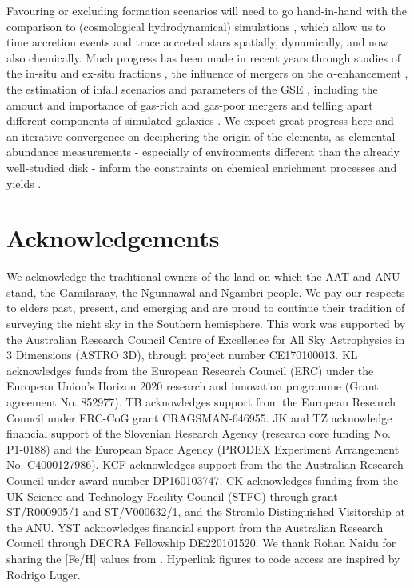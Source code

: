 \documentclass[fleqn,usenatbib]{mnras}
\begin{document}
Favouring or excluding formation scenarios will need to go hand-in-hand with the comparison to (cosmological hydrodynamical) simulations \citep[e.g.][]{Mackereth2018, Bonaca2017, Wu2021}, which allow us to time accretion events and trace accreted stars spatially, dynamically, and now also chemically. Much progress has been made in recent years through studies of the in-situ and ex-situ fractions \citep[e.g.][]{Pillepich2015}, the influence of mergers on the $\alpha$-enhancement \citep[e.g.][]{Zolotov2010, Grand2020, Buck2020, Renaud2021}, the estimation of infall scenarios and parameters of the GSE \citep[e.g.][]{Villalobos2008, Koppelman2021, Naidu2021}, including the amount and importance of gas-rich and gas-poor mergers \citep[e.g.][]{Fensch2017, Renaud2021b} and telling apart different components of simulated galaxies \citep[e.g.][]{Obreja2019}. We expect great progress here and an iterative convergence on deciphering the origin of the elements, as elemental abundance measurements - especially of environments different than the already well-studied disk - inform the constraints on chemical enrichment processes and yields \citep[e.g.][]{FernandezAlvar2018b, Vincenzo2019, Eitner2020, Sanders2021, Ishigaki2021}.

\section*{Acknowledgements}

We acknowledge the traditional owners of the land on which the AAT and ANU stand, the Gamilaraay, the Ngunnawal and Ngambri people. We pay our respects to elders past, present, and emerging and are proud to continue their tradition of surveying the night sky in the Southern hemisphere.
This work was supported by the Australian Research Council Centre of Excellence for All Sky Astrophysics in 3 Dimensions (ASTRO 3D), through project number CE170100013.
KL acknowledges funds from the European Research Council (ERC) under the European Union's Horizon 2020 research and innovation programme (Grant agreement No. 852977).
TB acknowledges support from the European Research Council under ERC-CoG grant CRAGSMAN-646955.
JK and TZ acknowledge financial support of the Slovenian Research Agency (research core funding No. P1-0188) and the European Space Agency (PRODEX Experiment Arrangement No. C4000127986).
KCF acknowledges support from the the Australian Research Council under award number DP160103747.
CK acknowledges funding from the UK Science and Technology Facility Council (STFC) through grant ST/R000905/1 and ST/V000632/1, and the Stromlo Distinguished Visitorship at the ANU.
YST acknowledges financial support from the Australian Research Council through DECRA Fellowship DE220101520.
We thank Rohan Naidu for sharing the [Fe/H] values from \citet{Naidu2020}. Hyperlink figures to code access are inspired by Rodrigo Luger.
\end{document}
